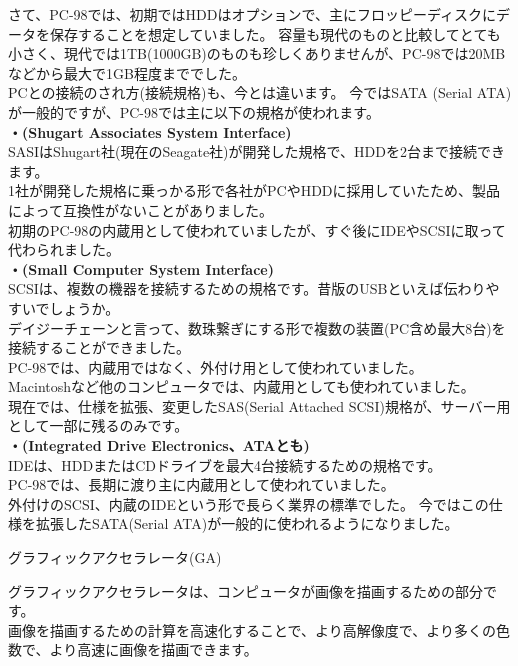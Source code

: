 \documentclass[b5paper,9pt,platex,dvipdfmx]{jsarticle}
\begin{document}
\begin{multicols*}{3}
\begin{enumerate}
  さて、PC-98では、初期ではHDDはオプションで、主にフロッピーディスクにデータを保存することを想定していました。
  容量も現代のものと比較してとても小さく、現代では1TB(1000GB)のものも珍しくありませんが、PC-98では20MBなどから最大で1GB程度まででした。\\
  PCとの接続のされ方(接続規格)も、今とは違います。
  今ではSATA (Serial ATA)が一般的ですが、PC-98では主に以下の規格が使われます。\\
  {\bf・(Shugart Associates System Interface)\\}
  SASIはShugart社(現在のSeagate社)が開発した規格で、HDDを2台まで接続できます。\\
  1社が開発した規格に乗っかる形で各社がPCやHDDに採用していたため、製品によって互換性がないことがありました。\\
  初期のPC-98の内蔵用として使われていましたが、すぐ後にIDEやSCSIに取って代わられました。\\
  {\bf・(Small Computer System Interface)\\}
  SCSIは、複数の機器を接続するための規格です。昔版のUSBといえば伝わりやすいでしょうか。\\
  デイジーチェーンと言って、数珠繋ぎにする形で複数の装置(PC含め最大8台)を接続することができました。\\
  PC-98では、内蔵用ではなく、外付け用として使われていました。\\
  Macintoshなど他のコンピュータでは、内蔵用としても使われていました。\\
  現在では、仕様を拡張、変更したSAS(Serial Attached SCSI)規格が、サーバー用として一部に残るのみです。\\
  {\bf・(Integrated Drive Electronics、ATAとも)\\}
  IDEは、HDDまたはCDドライブを最大4台接続するための規格です。\\
  PC-98では、長期に渡り主に内蔵用として使われていました。\\
  外付けのSCSI、内蔵のIDEという形で長らく業界の標準でした。
  今ではこの仕様を拡張したSATA(Serial ATA)が一般的に使われるようになりました。\\
  {\bf  \item グラフィックアクセラレータ(GA)\\}
  グラフィックアクセラレータは、コンピュータが画像を描画するための部分です。\\
  画像を描画するための計算を高速化することで、より高解像度で、より多くの色数で、より高速に画像を描画できます。\\

\end{enumerate}
\end{multicols*}
\end{document}
